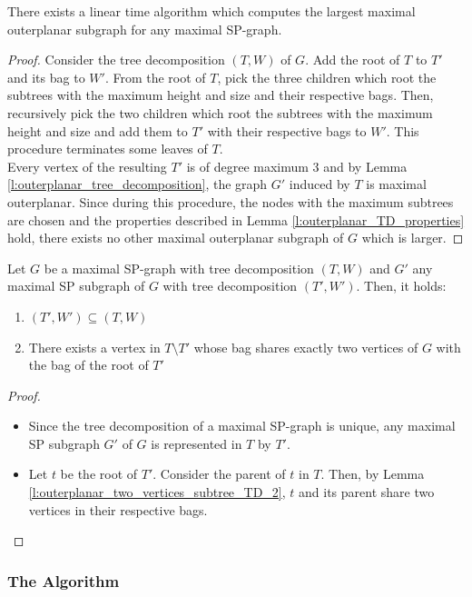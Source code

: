 \begin{lemma}
	There exists a linear time algorithm which computes the largest maximal outerplanar subgraph for any maximal SP-graph.
\end{lemma}
\begin{proof}
	Consider the tree decomposition $(T,W)$ of $G$. Add the root of $T$ to $T'$ and its bag to $W'$. From the root of $T$, pick the three children which root the subtrees with the maximum height and size and their respective bags. Then, recursively pick the two children which root the subtrees with the maximum height and size and add them to $T'$ with their respective bags to $W'$. This procedure terminates some leaves of $T$.\\
	Every vertex of the resulting $T'$ is of degree maximum 3 and by Lemma \ref{l:outerplanar_tree_decomposition}, the graph $G'$ induced by $T$ is maximal outerplanar. Since during this procedure, the nodes with the maximum subtrees are chosen and the properties described in Lemma \ref{l:outerplanar_TD_properties} hold, there exists no other maximal outerplanar subgraph of $G$ which is larger. 
\end{proof}

\begin{lemma}
	Let $G$ be a maximal SP-graph with tree decomposition $(T,W)$ and $G'$ any maximal SP subgraph of $G$ with tree decomposition $(T',W')$. Then, it holds:
	\begin{enumerate}
		\item $(T',W') \subseteq (T,W)$
		\item There exists a vertex in $T\setminus T'$ whose bag shares exactly two vertices of $G$ with the bag of the root of $T'$
	\end{enumerate}
\end{lemma}	
\begin{proof}
	\begin{itemize}
		\item Since the tree decomposition of a maximal SP-graph is unique, any maximal SP subgraph $G'$ of $G$ is represented in $T$ by $T'$.
		\item Let $t$ be the root of $T'$. Consider the parent of $t$ in $T$. Then, by Lemma \ref{l:outerplanar_two_vertices_subtree_TD_2}, $t$ and its parent share two vertices in their respective bags.
	\end{itemize}
\end{proof}


\subsubsection{The Algorithm}

